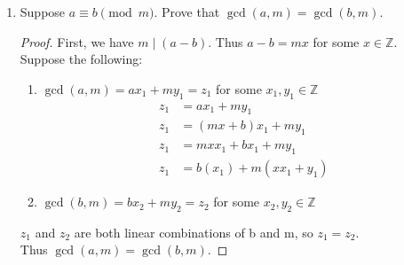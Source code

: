 \documentclass[11pt]{article}
\begin{document}
\begin{enumerate}
\begin{enumerate}
        \item Suppose $a\equiv b\pmod m$. Prove that $\gcd(a,m) = \gcd(b,m)$.
        \begin{proof}
            First, we have $m\mid (a-b)$. Thus $a-b = mx$ for some
            $x\in\mathbb{Z}$. \\
            Suppose the following:
            \begin{enumerate}
                \item $\gcd(a,m) = ax_1+my_1 = z_1$ for some $x_1,y_1\in\mathbb{Z}$
                \begin{align*}
                    z_1 &= ax_1+my_1 \\
                    z_1 &= (mx+b)x_1 + my_1 \\
                    z_1 &= mxx_1+bx_1+my_1 \\
                    z_1 &= b(x_1) + m(xx_1+y_1) 
                \end{align*}
                \item $\gcd(b,m) = bx_2+my_2 = z_2$ for some $x_2,y_2\in\mathbb{Z}$
            \end{enumerate} 
            $z_1$ and $z_2$ are both linear combinations of b and m, so $z_1=z_2$. \\
            Thus $\gcd(a,m) = \gcd(b,m)$.
        \end{proof}
    \end{enumerate}

    \end{enumerate} 
\end{document}
